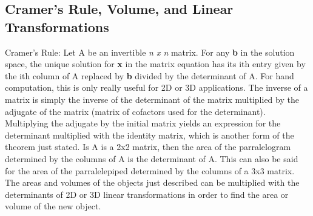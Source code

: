 \documentclass[12pt]{article}
\begin{document}
\subsection{Cramer's Rule, Volume, and Linear Transformations}
Cramer's Rule:
\newline
Let A be an invertible \textit{n x n} matrix. For any \textbf{b} in the solution space, the unique solution for \textbf{x} in the matrix equation has its ith entry given %
by the ith column of A replaced by \textbf{b} divided by the determinant of A. For hand computation, this is only really useful for 2D or 3D applications. The inverse of a %
matrix is simply the inverse of the determinant of the matrix multiplied by the adjugate of the matrix (matrix of cofactors used for the determinant). Multiplying the %
adjugate by the initial matrix yields an expression for the determinant multiplied with the identity matrix, which is another form of the theorem just stated. 
\newline
\newline
Is A is a 2x2 matrix, then the area of the parralelogram determined by the columns of A is the determinant of A. This can also be said for the area of the parralelepiped %
determined by the columns of a 3x3 matrix. The areas and volumes of the objects just described can be multiplied with the determinants of 2D or 3D linear transformations %
in order to find the area or volume of the new object. 
\end{document}
